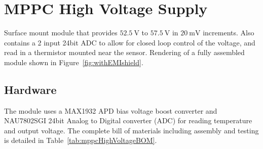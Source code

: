 \section{MPPC High Voltage Supply}

Surface mount module that provides $\SI{52.5}{\volt}$ to $\SI{57.5}{\volt}$ in $\SI{20}{\milli\volt}$ increments. Also contains a 2 input 24bit ADC to allow for closed loop control of the voltage, and read in a thermistor mounted near the sensor. Rendering of a fully assembled module shown in Figure~\ref{fig:withEMIshield}.


\subsection{Hardware}
The module uses a MAX1932 APD bias voltage boost converter and NAU7802SGI 24bit Analog to Digital converter (ADC) for reading temperature and output voltage. The complete bill of materials including assembly and testing is detailed in Table~\ref{tab:mppcHighVoltageBOM}.

